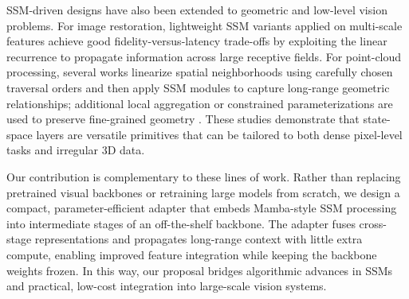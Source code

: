 SSM-driven designs have also been extended to geometric and low-level vision problems.  For image restoration, lightweight SSM variants applied on multi-scale features achieve good fidelity-versus-latency trade-offs by exploiting the linear recurrence to propagate information across large receptive fields.  For point-cloud processing, several works linearize spatial neighborhoods using carefully chosen traversal orders and then apply SSM modules to capture long-range geometric relationships; additional local aggregation or constrained parameterizations are used to preserve fine-grained geometry \cite{liang2024pointmamba,han2024mamba3d,zha2024lcm}.  These studies demonstrate that state-space layers are versatile primitives that can be tailored to both dense pixel-level tasks and irregular 3D data.

Our contribution is complementary to these lines of work.  Rather than replacing pretrained visual backbones or retraining large models from scratch, we design a compact, parameter-efficient adapter that embeds Mamba-style SSM processing into intermediate stages of an off-the-shelf backbone.  The adapter fuses cross-stage representations and propagates long-range context with little extra compute, enabling improved feature integration while keeping the backbone weights frozen.  In this way, our proposal bridges algorithmic advances in SSMs and practical, low-cost integration into large-scale vision systems.
 
